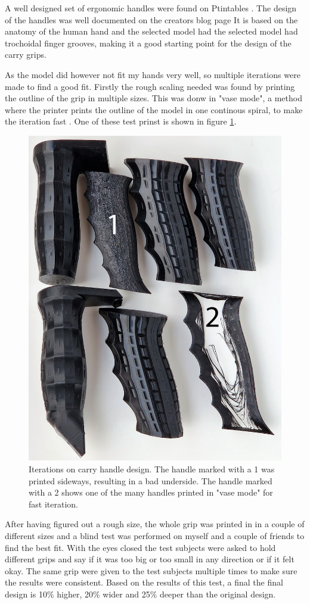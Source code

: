 A well designed set of ergonomic handles were found on Ptintables \cite{matulichErgonomicHandleBased}.
The design of the handles was well documented on the creators blog page \cite{matulichWhoseHandsAre2022}
It is based on the anatomy of the human hand and the selected model had the selected model had trochoidal finger grooves, making it a good starting point for the design of the carry grips.

As the model did however not fit my hands very well, so multiple iterations were made to find a good fit.
Firstly the rough scaling needed was found by printing the outline of the grip in multiple sizes.
This was donw in "vase mode", a method where the printer prints the outline of the model in one continous spiral, to make the iteration fast \cite{ghargeCuraVaseMode2022}.
One of these test prinst is shown in figure \ref{fig:handle_iteration}.

\begin{figure}[H]
    \centering
    \includegraphics[width=.5\textwidth]{figures/3d_print/handles.png}
    \caption{Iterations on carry handle design.
        The handle marked with a 1 was printed sideways, resulting in a bad underside.
        The handle marked with a 2 shows one of the many handles printed in "vase mode" for fast iteration.}
    \label{fig:handle_iteration}
\end{figure}

After having figured out a rough size, the whole grip was printed in in a couple of different sizes and a blind test was performed on myself and a couple of friends to find the best fit.
With the eyes closed the test subjects were asked to hold different grips and say if it was too big or too small in any direction or if it felt okay.
The same grip were given to the test subjects multiple times to make sure the results were consistent.
Based on the results of this test, a final the final design is 10\% higher, 20\% wider and 25\% deeper than the original design.


